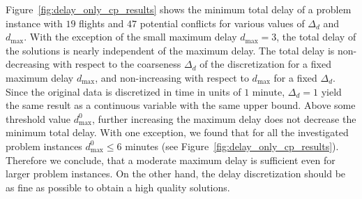 Figure~\ref{fig:delay_only_cp_results} shows the minimum total delay of a problem instance with $19$ flights and $47$ potential conflicts for various values of $\Delta_d$ and $d_{\max}$.
With the exception of the small maximum delay $d_\text{max} = 3$, the total delay of the solutions is nearly independent of the maximum delay.
The total delay is non-decreasing with respect to the coarseness $\Delta_d$ of the discretization for a fixed maximum delay $d_{\max}$, and non-increasing with respect to $d_{\max}$ for a fixed $\Delta_d$.
Since the original data is discretized in time in units of $1$ minute, $\Delta_d=1$ yield the same result as a continuous variable with the same upper bound.
Above some threshold value $d^0_\text{max}$, further increasing the maximum delay does not decrease the minimum total delay.
With one exception, we found that for all the investigated problem instances $d^0_\text{max}\leq6$ minutes (see Figure~\ref{fig:delay_only_cp_results}).
Therefore we conclude, that a moderate maximum delay is sufficient even for larger problem instances.
On the other hand, the delay discretization should be as fine as possible to obtain a high quality solutions.
